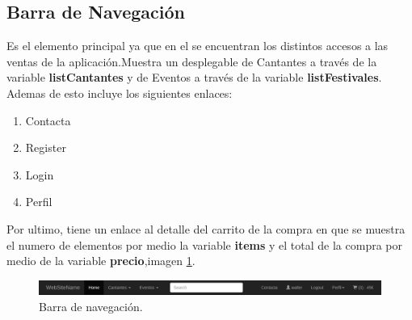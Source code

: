 \subsection{Barra de Navegación}
Es el elemento principal ya que en el se encuentran los distintos accesos a las ventas de la aplicación.Muestra un  desplegable de Cantantes a través de la variable \textbf{listCantantes} y de Eventos a través de la variable \textbf{listFestivales}. Ademas de esto incluye los siguientes enlaces:
\begin{enumerate}
\item Contacta
\item Register
\item Login
\item Perfil
\end{enumerate}
Por ultimo, tiene un enlace al detalle del carrito de la compra en que se muestra el numero de elementos por medio la variable \textbf{items} y el total de la compra por medio de la variable \textbf{precio},imagen \ref{fig:Nav_Bar}.
\begin{figure}[!h]
\begin{center}
   \includegraphics[width=0.9\linewidth]{Figures/Nav}
	\decoRule
	\caption[Barra de navegación]{Barra de navegación.}
\label{fig:Nav_Bar}
\end{center}
\end{figure}
